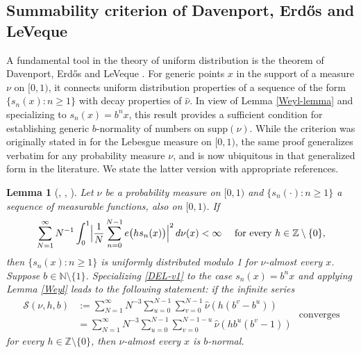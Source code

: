 \documentclass[12pt, twoside]{article}
\newtheorem{lemma}[theorem]{Lemma}
\theoremstyle{definition}
\numberwithin{equation}{section}
\begin{document}
\subsection{Summability criterion of Davenport, Erd\H{o}s and LeVeque} 
 A fundamental tool in the theory of uniform distribution is the theorem of Davenport, Erd\H{o}s and LeVeque \cite{del63}. For generic points $x$ in the support of a measure $\nu$ on $[0,1)$, it connects uniform distribution properties of a sequence of the form $\{s_n(x) : n \geq 1\}$ with decay properties of $\widehat{\nu}$. In view of Lemma \ref{Weyl-lemma} and specializing to $s_n(x) = b^n x$, this result provides a sufficient condition for establishing generic $b$-normality of numbers on supp$(\nu)$. While the criterion was originally stated in \cite{del63} for the Lebesgue measure on $[0,1)$, the same proof generalizes verbatim for any probability measure $\nu$, and is now ubiquitous in that generalized form in the literature. We state the latter version with appropriate references.       
\begin{lemma}[\cite{del63}, {\cite[Theorem 1.3]{Gao-Ma-Song-Zhang}}, {\cite[Theorem DEL]{PVZZ}}] \label{DEL-lemma}
Let $\nu$ be a probability measure on $[0,1)$ and $\{s_n(\cdot) : n \geq 1\}$ a sequence of measurable functions, also on $[0,1)$. If 
\begin{equation} \label{DEL-v1} 
\sum_{N=1}^{\infty} N^{-1} \int_{0}^{1} \Bigl| \frac{1}{N} \sum_{n=0}^{N-1} e \bigl(h s_n(x) \bigr)\Bigr|^2 \, d\nu(x) < \infty \quad \text{ for every } h \in \mathbb Z \setminus \{0\},  
\end{equation}  
then $\{s_n(x) : n \geq 1\}$ is uniformly distributed modulo 1 for $\nu$-almost every $x$. 
\vskip0.1in 
\noindent Suppose $b \in \mathbb N \setminus \{1\}$. Specializing \eqref{DEL-v1} to the case $s_n(x) = b^n x$ and applying Lemma \ref{Weyl} leads to the following statement: if the infinite series 
\begin{equation}
\begin{aligned} 
\mathscr{S}(\nu, h, b) &:= \sum_{N=1}^{\infty} N^{-3} \sum_{u = 0}^{N-1} \sum_{v = 0}^{N-1} \widehat{\nu}(h(b^v-b^u)) \\ &= \sum_{N=1}^{\infty} N^{-3} \sum_{u = 0}^{N-1} \sum_{v = 0}^{N-1-u} \widehat{\nu}(hb^u (b^v-1)) \end{aligned} \text{ converges } \label{DEL-sum}
\end{equation}  
 for every $h \in \mathbb Z \setminus \{0\}$, then $\nu$-almost every $x$ is $b$-normal.  
\end{lemma} 
\end{document}
